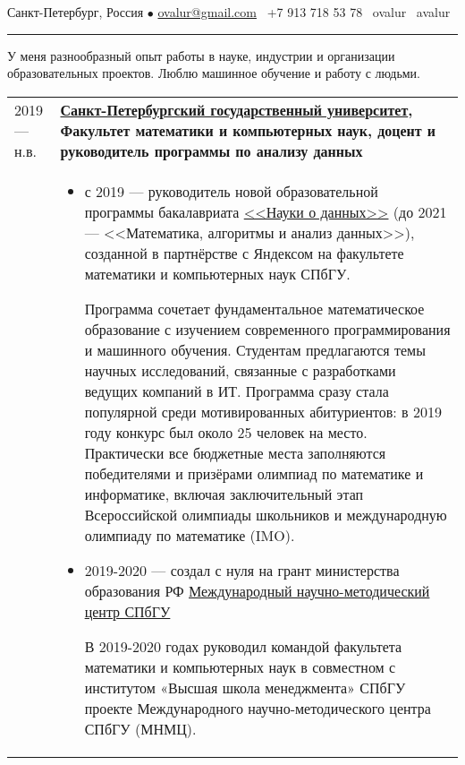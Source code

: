 \documentclass[11pt]{article}
\begin{document}

\vspace{0.5em}

\noindent Санкт-Петербург, Россия $\bullet$ \href{mailto:ovalur@gmail.com}{ovalur@gmail.com} \faMobile~+7 913 718 53 78 \faSendO~ovalur
\faGithub~avalur

\vspace{0.5em}
\hrule
\vspace{0.5em}

У меня разнообразный опыт работы в науке, индустрии и организации образовательных проектов. Люблю машинное обучение и работу с людьми.

\vspace{0.5em}
\begin{longtable} {l | p{}}
2019 — н.в. & {\textbf{\href{https://spbu.ru}{Санкт-Петербургский государственный университет}, Факультет математики и компьютерных наук, доцент и руководитель программы по анализу данных}} \\
&
\begin{itemize}
	\vspace{-1.5em}
	\item с 2019 — руководитель новой образовательной программы бакалавриата \href{https://maad.compscicenter.ru}{<<Науки о данных>>} (до 2021 — <<Математика, алгоритмы и анализ данных>>), созданной в партнёрстве с Яндексом на факультете математики и компьютерных наук СПбГУ.

	Программа сочетает фундаментальное математическое образование с изучением современного программирования и машинного обучения. Студентам предлагаются темы научных исследований, связанные с разработками ведущих компаний в ИТ. Программа сразу стала популярной среди мотивированных абитуриентов: в 2019 году конкурс был около 25 человек на место. Практически все бюджетные места заполняются победителями и призёрами олимпиад по математике и информатике, включая заключительный этап Всероссийской олимпиады школьников и международную олимпиаду по математике (IMO).

	\item 2019-2020 — создал с нуля на грант министерства образования РФ \href{https://gsom.spbu.ru/all_news/event2021-02-04/}{Международный научно-методический центр СПбГУ}

	В 2019-2020 годах руководил командой факультета математики и компьютерных наук в совместном с институтом «Высшая школа менеджмента» СПбГУ проекте Международного научно-методического центра СПбГУ (МНМЦ).


\end{itemize}
\end{longtable}
\end{document}
